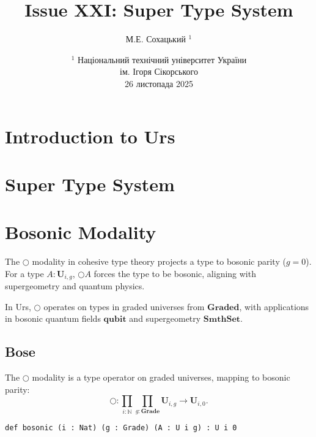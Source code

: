 \documentclass{article}
\begin{document}
\author { М.Е. Сохацький $^1$ }
\title { Issue XXI: Super Type System }
\date{ \small $^1$ Національний технічний університет України \\
       ім. Ігоря Сікорського \\
       26 листопада 2025 }
\maketitle

\begin{abstract}

\end{abstract}

\tableofcontents

\section{Introduction to Urs}

\section{Super Type System}

\section{Bosonic Modality}

The $\bigcirc$ modality in cohesive type theory projects a type to bosonic parity ($g = 0$).
For a type $A : \mathbf{U}_{i,g}$, $\bigcirc A$ forces the type to be bosonic,
aligning with supergeometry and quantum physics.

In Urs, $\bigcirc$ operates on types in graded universes from $\mathbf{Graded}$,
with applications in bosonic quantum fields $\mathbf{qubit}$ and supergeometry
$\mathbf{SmthSet}$.

\subsection{Bose}

\begin{definition}\label{def:bosonic-formation}
The $\bigcirc$ modality is a type operator on graded universes, mapping to bosonic parity:
\[
    \bigcirc : \prod_{i : \mathbb{N}} \prod_{g : \mathbf{Grade}}
    \mathbf{U}_{i,g} \to \mathbf{U}_{i,0}.
\]
\begin{lstlisting}[mathescape=true]
def bosonic (i : Nat) (g : Grade) (A : U i g) : U i 0
\end{lstlisting}
\end{definition}
\end{document}
